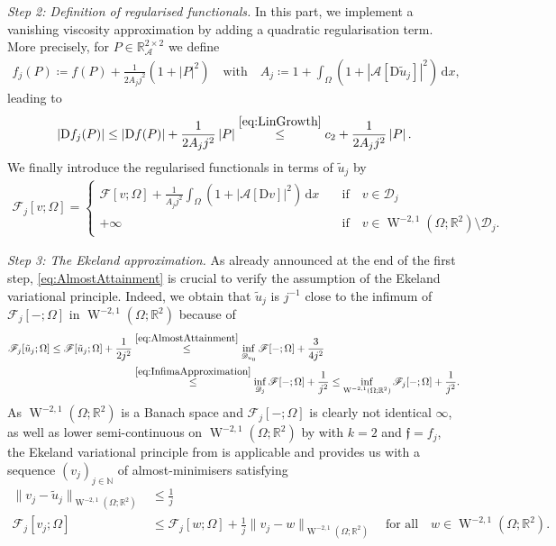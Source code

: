\documentclass[a4paper,10pt,reqno,oneside]{amsart}
\numberwithin{equation}{section}
\newcommand{\R}{\mathbb R}
\newcommand{\N}{\mathbb N}
\newcommand{\A}{\mathscr{A}}
\newcommand{\sobo}{\operatorname{W}}
\newcommand{\D}{\mathrm{D}}
\newcommand{\dx}[1]{\,\mathrm{d}#1}
\newcommand{\abs}[1]{\left\lvert#1\right\rvert}
\newcommand{\F}{\mathscr{F}}
\begin{document}
\emph{Step 2: Definition of regularised functionals.} In this part, we implement a vanishing viscosity approximation by adding a quadratic regularisation term. More precisely, for $P\in\R^{2\times 2}_{\A}$ we define
\begin{align}\label{eq:DefinitionOfIntegrands}
	f_j(P)\coloneqq f(P) + \frac{1}{2A_j j^2}(1+\abs{P}^2)\quad\mbox{with}\quad A_j \coloneqq 1+\int_\Omega (1+ \abs{\A[\D\tilde{u}_j]}^2)\dx{x},
\end{align}
leading to
\begin{align}\label{eq:sigma}
	\abs{\D f_j(P)} \leq \abs{\D f(P)} + \frac{1}{2A_j j^2}\abs{P}\overset{\eqref{eq:LinGrowth}}{\leq} c_2+ \frac{1}{2A_j j^2}\abs{P}.
\end{align}
We finally introduce the regularised functionals in terms of $\tilde{u}_j$ by
\begin{align*}
\mathscr F_j [v;\Omega] =  \begin{cases}\displaystyle
	 \mathscr F[v;\Omega] + \frac{1}{A_j j^2} \int_\Omega (1+\abs{\A[\D v] }^2)\dx{x}\quad&\mbox{if}  \quad v\in\mathscr{D}_j\\
	+\infty\quad&\mbox{if}\quad v\in\sobo^{-2,1}(\Omega;\R^2) \setminus \mathscr{D}_j. 
\end{cases}
\end{align*}

\emph{Step 3: The Ekeland approximation.} As already announced at the end of the first step,  \eqref{eq:AlmostAttainment} is crucial to verify the assumption of the Ekeland variational principle. Indeed, we obtain that $\tilde{u}_j$ is $j^{-1}$ close to the infimum of $\F_j[-;\Omega]$ in $\sobo^{-2,1}(\Omega;\R^2)$ because of
\begin{align} \label{eq:CloseToInf_Ekeland}
	\F_j[\tilde{u}_j;\Omega] \leq \F[\tilde{u}_j;\Omega] + \frac{1}{2j^2} 
	&\overset{\eqref{eq:AlmostAttainment}}\leq \inf_{\mathscr{D}_{u_0}} \F[-;\Omega] + \frac{3}{4j^2}  \\
	&\overset{\eqref{eq:InfimaApproximation}}{\leq} \inf_{\mathscr{D}_j} \F[-;\Omega] + \frac{1}{j^2} \leq \inf_{\sobo^{-2,1}(\Omega;\R^2)} \F_j[-;\Omega] + \frac{1}{j^2}\notag .
\end{align}
As $\sobo^{-2,1}(\Omega;\R^2)$ is a Banach space and $\F_j[-;\Omega]$ is clearly not identical $\infty$, as well as lower semi-continuous on $\sobo^{-2,1}(\Omega;\R^2)$ by  with $k=2$ and $\mathfrak{f} = f_j$, the Ekeland variational principle from  is applicable and provides us with a sequence $(v_j)_{j\in\N}$ of almost-minimisers satisfying
\begin{align}
	\|v_j - \tilde{u}_j \|_{\sobo^{-2,1}(\Omega;\R^2)} &\leq \frac{1}{j} \label{eq:Ekeland_1}\\
	\F_j [v_j; \Omega] &\leq \F_j[w;\Omega] + \frac{1}{j} \|v_j -w\|_{\sobo^{-2,1}(\Omega;\R^2)}\quad\mbox{for all}\quad w\in \sobo^{-2,1}(\Omega;\R^2)\label{eq:Ekeland_2}. 
\end{align}
\end{document}
